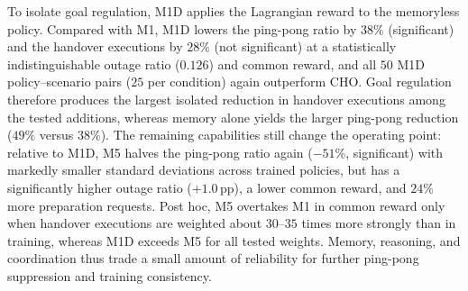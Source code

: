 \documentclass[journal]{IEEEtran}
\begin{document}
To isolate goal regulation, M1D applies the Lagrangian reward to the
memoryless policy. Compared with M1, M1D lowers the ping-pong ratio by $38\%$
(significant) and the handover executions by $28\%$ (not significant) at a
statistically indistinguishable outage ratio ($0.126$) and common reward, and
all $50$ M1D policy--scenario pairs ($25$ per condition) again outperform CHO. Goal regulation therefore produces the largest isolated reduction in handover
executions among the tested additions, whereas memory alone yields the larger
ping-pong reduction ($49\%$ versus $38\%$). The remaining capabilities
still change the operating point: relative to M1D, M5 halves the ping-pong
ratio again ($-51\%$, significant) with markedly smaller standard deviations
across trained policies, but has a significantly higher outage ratio
($+1.0$\,pp), a lower common reward, and $24\%$ more preparation requests.
Post hoc, M5 overtakes M1 in common reward only when handover executions are
weighted about $30$--$35$ times more strongly than in training, whereas M1D
exceeds M5 for all tested weights. Memory, reasoning, and coordination thus trade a small
amount of reliability for further ping-pong suppression and training
consistency.
\end{document}
